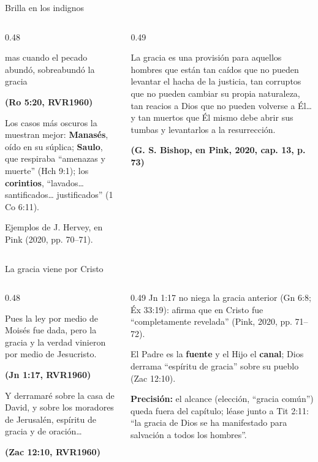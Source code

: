 \documentclass[hyperref={bookmarks=false},aspectratio=169]{beamer}
\newcommand{\fuente}[1]{\par\hfill{\upshape\bfseries\footnotesize\textcolor{azul}{#1}}}
\newcommand{\destacar}[1]{\textbf{\textcolor{azul}{#1}}}
\newcommand{\precision}[1]{{\footnotesize\color{gris}\textbf{Precisión:} #1}}
\begin{document}
\begin{frame}{Brilla en los indignos}
\begin{columns}[t,onlytextwidth]
\begin{column}{0.48\textwidth}
\begin{cita}mas cuando el pecado abundó, sobreabundó la gracia\fuente{(Ro 5:20, RVR1960)}\end{cita}
\small Los casos más oscuros la muestran mejor: \destacar{Manasés}, oído en su súplica; \destacar{Saulo}, que respiraba ``amenazas y muerte'' (Hch 9:1); los \destacar{corintios}, ``lavados\ldots{} santificados\ldots{} justificados'' (1 Co 6:11).\par
{\scriptsize\color{gris}Ejemplos de J. Hervey, en Pink (2020, pp. 70--71).}
\end{column}
\begin{column}{0.49\textwidth}
\scriptsize\begin{cita}[colback=dorado!8!papiro,colframe=dorado!85!azul]
La gracia es una provisión para aquellos hombres que están tan caídos que no pueden levantar el hacha de la justicia, tan corruptos que no pueden cambiar su propia naturaleza, tan reacios a Dios que no pueden volverse a Él\ldots{} y tan muertos que Él mismo debe abrir sus tumbas y levantarlos a la resurrección.\fuente{(G. S. Bishop, en Pink, 2020, cap. 13, p. 73)}\end{cita}
\end{column}
\end{columns}
\end{frame}

\begin{frame}{La gracia viene por Cristo}
\begin{columns}[t,onlytextwidth]
\begin{column}{0.48\textwidth}
\begin{cita}Pues la ley por medio de Moisés fue dada, pero la gracia y la verdad vinieron por medio de Jesucristo.\fuente{(Jn 1:17, RVR1960)}\end{cita}
\begin{cita}Y derramaré sobre la casa de David, y sobre los moradores de Jerusalén, espíritu de gracia y de oración\ldots\fuente{(Zac 12:10, RVR1960)}\end{cita}
\end{column}
\begin{column}{0.49\textwidth}\small
Jn 1:17 no niega la gracia anterior (Gn 6:8; Éx 33:19): afirma que en Cristo fue ``completamente revelada'' (Pink, 2020, pp. 71--72).\par\medskip
El Padre es la \destacar{fuente} y el Hijo el \destacar{canal}; Dios derrama ``espíritu de gracia'' sobre su pueblo (Zac 12:10).\par\smallskip
\precision{el alcance (elección, ``gracia común'') queda fuera del capítulo; léase junto a Tit 2:11: ``la gracia de Dios se ha manifestado para salvación a todos los hombres''.}
\end{column}
\end{columns}
\end{frame}
\end{document}
